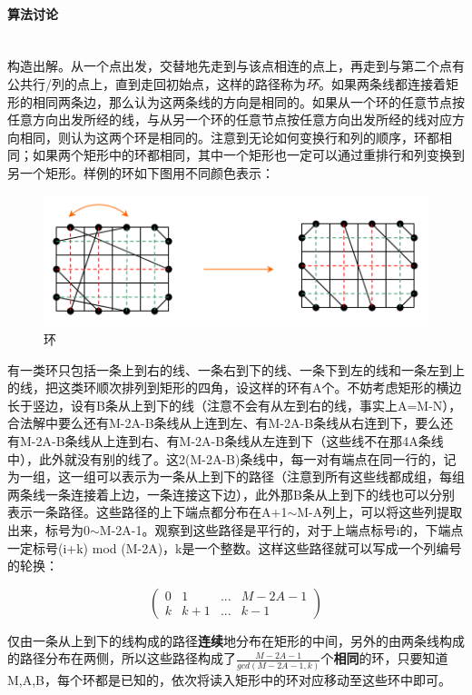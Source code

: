 \documentclass[UTF8]{ctexart}
\newcommand{\myparagraph}[1]{\paragraph{#1}\mbox{}\\}
\theoremstyle{nonumberplain}
\begin{document}
		\myparagraph{算法讨论}
		
			构造出解。从一个点出发，交替地先走到与该点相连的点上，再走到与第二个点有公共行/列的点上，直到走回初始点，这样的路径称为\emph{环}。如果两条线都连接着矩形的相同两条边，那么认为这两条线的方向是相同的。如果从一个环的任意节点按任意方向出发所经的线，与从另一个环的任意节点按任意方向出发所经的线对应方向相同，则认为这两个环是相同的。注意到无论如何变换行和列的顺序，环都相同；如果两个矩形中的环都相同，其中一个矩形也一定可以通过重排行和列变换到另一个矩形。样例的环如下图用不同颜色表示：
			
			\begin{figure}[ht]
				\centering
				\includegraphics[width=\textwidth]{fig269e_1.jpg}
				\caption{环}
			\end{figure}
			
			有一类环只包括一条上到右的线、一条右到下的线、一条下到左的线和一条左到上的线，把这类环顺次排列到矩形的四角，设这样的环有A个。不妨考虑矩形的横边长于竖边，设有B条从上到下的线（注意不会有从左到右的线，事实上A=M-N），合法解中要么还有M-2A-B条线从上连到左、有M-2A-B条线从右连到下，要么还有M-2A-B条线从上连到右、有M-2A-B条线从左连到下（这些线不在那4A条线中），此外就没有别的线了。这2(M-2A-B)条线中，每一对有端点在同一行的，记为一组，这一组可以表示为一条从上到下的路径（注意到所有这些线都成组，每组两条线一条连接着上边，一条连接这下边），此外那B条从上到下的线也可以分别表示一条路径。这些路径的上下端点都分布在A+1$\sim$M-A列上，可以将这些列提取出来，标号为0$\sim$M-2A-1。观察到这些路径是平行的，对于上端点标号i的，下端点一定标号(i+k) mod (M-2A)，k是一个整数。这样这些路径就可以写成一个列编号的轮换：
			
			$$\begin{pmatrix} 0 & 1 & ... & M-2A-1 \\ k & k+1 & ... & k-1 \end{pmatrix}$$
			
			仅由一条从上到下的线构成的路径\textbf{连续}地分布在矩形的中间，另外的由两条线构成的路径分布在两侧，所以这些路径构成了$\frac{M-2A-1}{gcd(M-2A-1,k)}$个\textbf{相同}的环，只要知道M,A,B，每个环都是已知的，依次将读入矩形中的环对应移动至这些环中即可。
		
\end{document}
